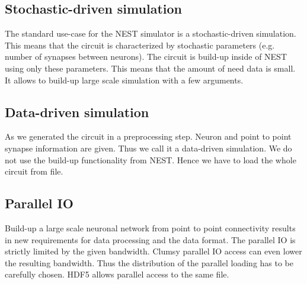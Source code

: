 \documentclass[a4paper]{article}
\begin{document}
\subsection{Stochastic-driven simulation}
The standard use-case for the NEST simulator is a stochastic-driven simulation. This means
that the circuit is characterized by stochastic parameters (e.g. number of synapses between neurons).
The circuit is build-up inside of NEST using only these parameters.
This means that the amount of need data is small. It allows to build-up large scale simulation
with a few arguments.
\subsection{Data-driven simulation}
As we generated the circuit in a preprocessing step. Neuron and point to point synapse information are given.
Thus we call it a data-driven simulation. We do not use the build-up functionality from NEST.
Hence we have to load the whole circuit from file.

\subsection{Parallel IO}
Build-up a large scale neuronal network from point to point connectivity results in new requirements for data processing and the data format. The parallel IO is strictly limited by the given bandwidth. Clumsy parallel IO access can even lower the resulting bandwidth.
Thus the distribution of the parallel loading has to be carefully chosen. HDF5 allows parallel access to the same file.
\end{document}
